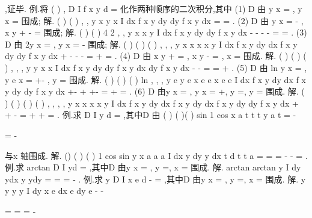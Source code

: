 \int \int 
\int \int 
\int \int 
,证毕. 
\textcolor{lyred}{例}.将
(
)
,
D
I
f x y d\sigma 
=\int \int 
化作两种顺序的二次积分,其中 
(1) D 由
y
x
=
, y
x
=
围成; 
解.
(
)
(
)
,
,
y
x
y
x
I
dx
f x y dy
dy
f x y dx
=
=
\int 
\int 
\int 
\int 
. 
(2) D 由
y
x
=
-
,
x
y
+
-
=
围成; 
解.
(
)
(
)
4 2
,
,
y
x
x
y
I
dx
f x y dy
dy
f x y dx
-
-
-
-
=
=
\int 
\int 
\int 
\int 
. 
(3) D 由
2y
x
=
,
y
x
=
-
围成; 
解.
(
)
(
)
(
)
,
,
,
y
x
x
x
x
y
I
dx
f x y dy
dx
f x y dy
dy
f x y dx
+
-
-
-
=
+
=
\int 
\int 
\int 
\int 
\int 
\int 
. 
(4) D 由
x
y
+
=
,
x
y
-
=
,
x =
围成. 
解.
(
)
(
)
(
)
,
,
,
y
y
x
x
I
dx
f x y dy
dy
f x y dx
dy
f x y dx
-
-
=
=
+
\int 
\int 
\int \int 
\int 
\int 
. 
(5) D 由
ln
y
x
=
,
y
e
x
=
+-
,
y =
围成. 
解.
(
)
(
)
(
)
ln
,
,
,
y
e
y
e
x
e
e
x
e
e
I
dx
f x y dy
dx
f x y dy
dy
f x y dx
+-
+
+-
=
+
=
\int 
\int 
\int 
\int 
\int 
\int 
. 
(6) D 由y
x
=
,
y
x
=
+,
y =,
y =
围成. 
解.
(
)
(
)
(
)
(
)
,
,
,
,
y
x
x
x
x
y
I
dx
f x y dy
dx
f x y dy
dx f x y dy
dy
f x y dx
+
+
-
=
+
+
=
\int 
\int 
\int 
\int 
\int \int 
\int 
\int 
. 
\textcolor{lyred}{例}.求
D
I
y d\sigma 
=\int \int 
,其中D 由
(
)
(
)(
)
sin
1 cos
x
a t
t
t
y
a
t
\pi 
=
-

\le \le 

=
-

与x 轴围成. 
解.
()
(
)
(
)
1 cos
sin
y x
a
a
a
I
dx
y dy
y dx
t
d t
t
a
\pi 
\pi 
\pi 
\pi 
=
=
=
-
-
=
\int 
\int 
\int 
\int 
. 
\textcolor{lyred}{例}.求
arctan
D
I
yd\sigma 
=\int \int 
,其中D 由y
x
=
,
y =,
x =
围成. 
解.
arctan
arctan
y
I
dy
ydx
y
ydy
\pi 
=
=
=
-
\int \int 
\int 
. 
\textcolor{lyred}{例}.求
y
D
I
x e
d\sigma 
-
=\int \int 
,其中D 由y
x
=
,
y =,
x =
围成. 
解.
y
y
y
y
I
dy x e
dx
e
dy
e
-
-


=
=
=
-




